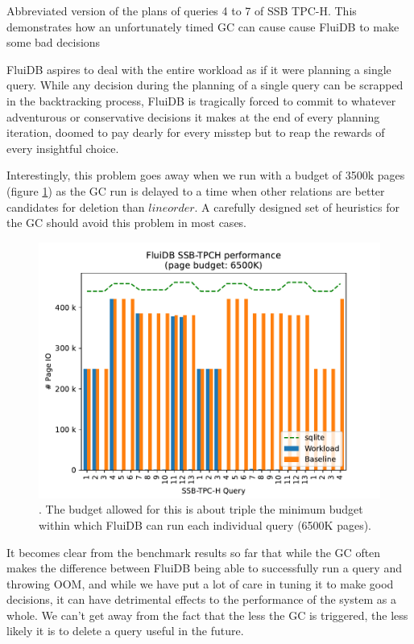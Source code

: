 \begin{code}
\begin{verbatim}
\end{verbatim}
  \caption{\label{fig:reverse_operations_ev}Abbreviated version of the
    plans of queries 4 to 7 of SSB TPC-H. This demonstrates how an
    unfortunately timed GC can cause cause FluiDB to make some bad decisions}

\end{code}

FluiDB aspires to deal with the entire workload as if it were planning
a single query. While any decision during the planning of a single
query can be scrapped in the backtracking process, FluiDB is
tragically forced to commit to whatever adventurous or conservative
decisions it makes at the end of every planning iteration, doomed to
pay dearly for every misstep but to reap the rewards of every
insightful choice.

Interestingly, this problem goes away when we run with a budget of
3500k pages (figure \ref{fig:extra_large_budget_plot}) as the GC run
is delayed to a time when other relations are better candidates for
deletion than \(\mathit{lineorder}\). A carefully designed set of
heuristics for the GC should avoid this problem in most cases.

\begin{figure}[p]
  \centering
  \includegraphics[width=.9\linewidth]{./plans/workload_6500K.pdf}
  \caption{\label{fig:extra_large_budget_plot}
    \ioperfdescr. The budget
    allowed for this is about triple the minimum budget within which
    FluiDB can run each individual query (6500K pages).}
\end{figure}

  It becomes clear from the benchmark results so far that while the GC
  often makes the difference between FluiDB being able to successfully
  run a query and throwing OOM, and while we have put a lot of care in
  tuning it to make good decisions, it can have detrimental effects to
  the performance of the system as a whole. We can't get away from the
  fact that the less the GC is triggered, the less likely it is to
  delete a query useful in the future.

